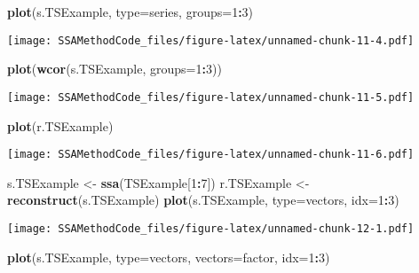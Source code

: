 \documentclass[
]{article}
\newenvironment{Shaded}{\begin{snugshade}}{\end{snugshade}}
\newcommand{\AttributeTok}[1]{\textcolor[rgb]{0.13,0.29,0.53}{#1}}
\newcommand{\DecValTok}[1]{\textcolor[rgb]{0.00,0.00,0.81}{#1}}
\newcommand{\FunctionTok}[1]{\textcolor[rgb]{0.13,0.29,0.53}{\textbf{#1}}}
\newcommand{\NormalTok}[1]{#1}
\newcommand{\OtherTok}[1]{\textcolor[rgb]{0.56,0.35,0.01}{#1}}
\newcommand{\SpecialCharTok}[1]{\textcolor[rgb]{0.81,0.36,0.00}{\textbf{#1}}}
\newcommand{\StringTok}[1]{\textcolor[rgb]{0.31,0.60,0.02}{#1}}
\begin{document}
\begin{Shaded}
\begin{Highlighting}[]
\FunctionTok{plot}\NormalTok{(s.TSExample, }\AttributeTok{type=}\StringTok{\textquotesingle{}series\textquotesingle{}}\NormalTok{, }\AttributeTok{groups=}\DecValTok{1}\SpecialCharTok{:}\DecValTok{3}\NormalTok{)}
\end{Highlighting}
\end{Shaded}

\texttt{[image: SSAMethodCode\_files/figure-latex/unnamed-chunk-11-4.pdf]}

\begin{Shaded}
\begin{Highlighting}[]
\FunctionTok{plot}\NormalTok{(}\FunctionTok{wcor}\NormalTok{(s.TSExample, }\AttributeTok{groups=}\DecValTok{1}\SpecialCharTok{:}\DecValTok{3}\NormalTok{))}
\end{Highlighting}
\end{Shaded}

\texttt{[image: SSAMethodCode\_files/figure-latex/unnamed-chunk-11-5.pdf]}

\begin{Shaded}
\begin{Highlighting}[]
\FunctionTok{plot}\NormalTok{(r.TSExample)}
\end{Highlighting}
\end{Shaded}

\texttt{[image: SSAMethodCode\_files/figure-latex/unnamed-chunk-11-6.pdf]}

\begin{Shaded}
\begin{Highlighting}[]
\NormalTok{s.TSExample }\OtherTok{\textless{}{-}} \FunctionTok{ssa}\NormalTok{(TSExample[}\DecValTok{1}\SpecialCharTok{:}\DecValTok{7}\NormalTok{])}
\NormalTok{r.TSExample }\OtherTok{\textless{}{-}} \FunctionTok{reconstruct}\NormalTok{(s.TSExample)}
\FunctionTok{plot}\NormalTok{(s.TSExample, }\AttributeTok{type=}\StringTok{\textquotesingle{}vectors\textquotesingle{}}\NormalTok{, }\AttributeTok{idx=}\DecValTok{1}\SpecialCharTok{:}\DecValTok{3}\NormalTok{)}
\end{Highlighting}
\end{Shaded}

\texttt{[image: SSAMethodCode\_files/figure-latex/unnamed-chunk-12-1.pdf]}

\begin{Shaded}
\begin{Highlighting}[]
\FunctionTok{plot}\NormalTok{(s.TSExample, }\AttributeTok{type=}\StringTok{\textquotesingle{}vectors\textquotesingle{}}\NormalTok{, }\AttributeTok{vectors=}\StringTok{\textquotesingle{}factor\textquotesingle{}}\NormalTok{, }\AttributeTok{idx=}\DecValTok{1}\SpecialCharTok{:}\DecValTok{3}\NormalTok{)}
\end{Highlighting}
\end{Shaded}
\end{document}
